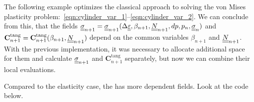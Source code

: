\documentclass[12pt]{article}
\newcommand{\todolink}{\todo[fancyline, size=\scriptsize]{TOCITE}}
\begin{document}
The following example optimizes the classical approach to solving the von Mises plasticity problem:~\eqref{eqn:cylinder_var_1}--\eqref{eqn:cylinder_var_2}.
We can conclude from this, that the fields $\underline{\underline{\sigma}}_{n+1} = \underline{\underline{\sigma}}_{n+1}(\Delta\underline{\underline{\varepsilon}}, \beta_{n+1}, \underline{\underline{N}}_{n+1}, dp, p_n, \underline{\underline{\sigma}}_n)$ and $\mathbf{C}^\text{tang}_{n+1} = \mathbf{C}^\text{tang}_{n+1}(\beta_{n+1}, \underline{\underline{N}}_{n+1})$ depend on the common variables $\beta_{n+1}$ and $\underline{\underline{N}}_{n+1}$. With the previous implementation, it was necessary to allocate additional space for them and calculate $\underline{\underline{\sigma}}_{n+1}$ and $\mathbf{C}^\text{tang}_{n+1}$ separately, but now we can combine their local evaluations.

Compared to the elasticity case, the   has more dependent fields. Look at the code below.
\end{document}

